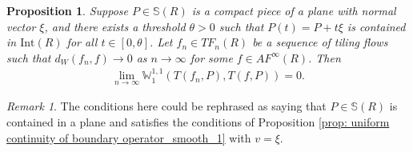\documentclass[11pt]{article}
\newtheorem{prop}[thm]{Proposition}
\theoremstyle{remark}
\newtheorem{rem}[thm]{Remark}
\theoremstyle{definition}
\newcommand{\m}[1]{\mathbb{#1}}
\begin{document}
\begin{prop}\label{prop: tiling flow boundary on planes}
Suppose $P\in \m S(R)$ is a compact piece of a plane with normal vector $\xi$, and there exists a threshold $\theta>0$ such that $P(t) = P + t\xi$ is contained in $\text{Int}(R)$ for all $t\in [0,\theta]$. Let $f_n\in TF_n(R)$ be a sequence of tiling flows such that $d_W(f_n,f)\to 0$ as $n\to \infty$ for some $f\in AF^\infty(R)$. Then
\begin{align*}
   \lim_{n\to \infty} \m W_1^{1,1}(T(f_n,P),T(f,P)) = 0.
\end{align*}
\end{prop}
\begin{rem}
The conditions here could be rephrased as saying that $P\in \m S(R)$ is contained in a plane and satisfies the conditions of Proposition \ref{prop: uniform continuity of boundary operator_smooth_1} with $v=\xi$. 
\end{rem}
\end{document}
